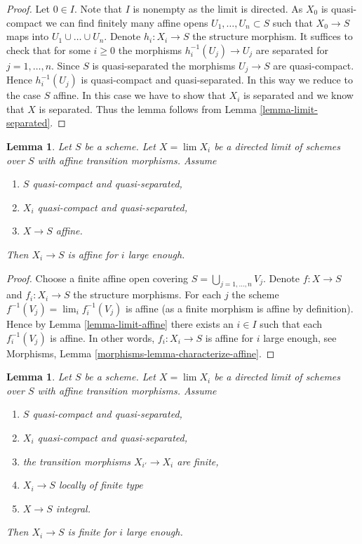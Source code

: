 \documentclass{stacks-project}
\theoremstyle{plain}
\newtheorem{lemma}[subsection]{Lemma}
\theoremstyle{definition}
\theoremstyle{remark}
\numberwithin{equation}{subsection}
\def\lim{\mathop{\mathrm{lim}}\nolimits}
\begin{document}
\begin{proof}
Let $0 \in I$. Note that $I$ is nonempty as the limit is directed.
As $X_0$ is quasi-compact we can find finitely many
affine opens $U_1, \ldots, U_n \subset S$ such that
$X_0 \to S$ maps into $U_1 \cup \ldots \cup U_n$.
Denote $h_i : X_i \to S$ the structure morphism.
It suffices to check that for some $i \geq 0$ the morphisms
$h_i^{-1}(U_j) \to U_j$ are separated for $j = 1, \ldots,  n$.
Since $S$ is quasi-separated the morphisms $U_j \to S$ are quasi-compact.
Hence $h_i^{-1}(U_j)$ is quasi-compact and quasi-separated.
In this way we reduce to the case $S$ affine. In this case we
have to show that $X_i$ is separated and we know that $X$ is separated.
Thus the lemma follows from Lemma \ref{lemma-limit-separated}.
\end{proof}

\begin{lemma}
\label{lemma-eventually-affine}
Let $S$ be a scheme. Let $X = \lim X_i$ be a directed limit of schemes
over $S$ with affine transition morphisms. Assume
\begin{enumerate}
\item $S$ quasi-compact and quasi-separated,
\item $X_i$ quasi-compact and quasi-separated,
\item $X \to S$ affine.
\end{enumerate}
Then $X_i \to S$ is affine for $i$ large enough.
\end{lemma}

\begin{proof}
Choose a finite affine open covering $S = \bigcup_{j = 1, \ldots, n} V_j$.
Denote $f : X \to S$ and $f_i : X_i \to S$ the structure morphisms.
For each $j$ the scheme $f^{-1}(V_j) = \lim_i f_i^{-1}(V_j)$
is affine (as a finite morphism is affine by definition). Hence by
Lemma \ref{lemma-limit-affine} there exists an $i \in I$ such that
each $f_i^{-1}(V_j)$ is affine. In other words, $f_i : X_i \to S$ is
affine for $i$ large enough, see
Morphisms, Lemma \ref{morphisms-lemma-characterize-affine}.
\end{proof}

\begin{lemma}
\label{lemma-eventually-finite}
Let $S$ be a scheme. Let $X = \lim X_i$ be a directed limit of schemes
over $S$ with affine transition morphisms. Assume
\begin{enumerate}
\item $S$ quasi-compact and quasi-separated,
\item $X_i$ quasi-compact and quasi-separated,
\item the transition morphisms $X_{i'} \to X_i$ are finite,
\item $X_i \to S$ locally of finite type
\item $X \to S$ integral.
\end{enumerate}
Then $X_i \to S$ is finite for $i$ large enough.
\end{lemma}
\end{document}
